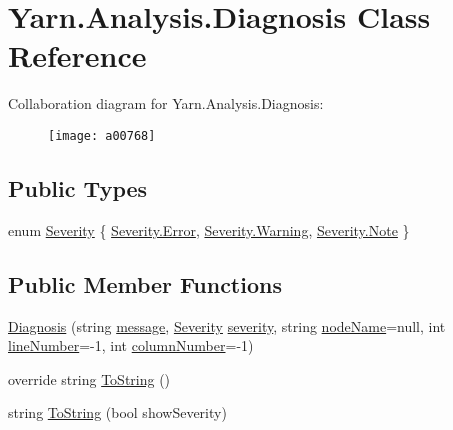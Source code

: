\hypertarget{a00093}{\section{Yarn.\-Analysis.\-Diagnosis Class Reference}
\label{a00093}
}


Collaboration diagram for Yarn.\-Analysis.\-Diagnosis\-:
\nopagebreak
\begin{figure}[H]
\begin{center}
\leavevmode
\texttt{[image: a00768]}
\end{center}
\end{figure}
\subsection*{Public Types}
\begin{DoxyCompactItemize}
\item 
enum \hyperlink{a00093_a227813cbc8fa03c3448a612ffc909d1c}{Severity} \{ \hyperlink{a00093_a227813cbc8fa03c3448a612ffc909d1ca902b0d55fddef6f8d651fe1035b7d4bd}{Severity.\-Error}, 
\hyperlink{a00093_a227813cbc8fa03c3448a612ffc909d1ca0eaadb4fcb48a0a0ed7bc9868be9fbaa}{Severity.\-Warning}, 
\hyperlink{a00093_a227813cbc8fa03c3448a612ffc909d1ca3b0649c72650c313a357338dcdfb64ec}{Severity.\-Note}
 \}
\end{DoxyCompactItemize}
\subsection*{Public Member Functions}
\begin{DoxyCompactItemize}
\item 
\hyperlink{a00093_ad3fd818f1be98dc803e5bec959153824}{Diagnosis} (string \hyperlink{a00093_ac7ed070dddd2613c08e7874ea5afb3af}{message}, \hyperlink{a00093_a227813cbc8fa03c3448a612ffc909d1c}{Severity} \hyperlink{a00093_ad90ffa839ce0f568a099bb37b4a6c4da}{severity}, string \hyperlink{a00093_a662aca4ad2af5116c2cf6773daf1a847}{node\-Name}=null, int \hyperlink{a00093_a0bd73f1c684bfd66ae7b6bef8f2972d0}{line\-Number}=-\/1, int \hyperlink{a00093_a658e7fb05555c0f9ab5f80057bdc1408}{column\-Number}=-\/1)
\item 
override string \hyperlink{a00093_a4475eb5890c340da5c0012e25c2c86ae}{To\-String} ()
\item 
string \hyperlink{a00093_a985dee7ca27aa896332590133606b6a9}{To\-String} (bool show\-Severity)
\end{DoxyCompactItemize}
